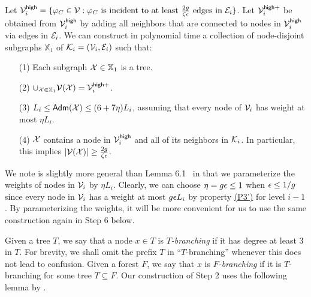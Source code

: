 \begin{lemma}\label{lm:Clustering-Step1T2} Let $\mathcal{V}^{\mathsf{high}}_i = \{\varphi_{C} \in \mathcal{V}: \varphi_{C} \mbox{ is incident to at least $\frac{2g}{\zeta\epsilon}$ edges in } \mathcal{E}_i\}$. Let $\mathcal{V}_i^{\mathsf{high}+}$ be obtained from $\mathcal{V}^{\mathsf{high}}_i$  by adding all neighbors that are connected to nodes in $\mathcal{V}^{\mathsf{high}}_i$ via edges in $\mathcal{E}_i$. We can construct in polynomial time a collection of node-disjoint subgraphs $\mathbb{X}_1$ of $\mathcal{K}_i =(\mathcal{V}_i, \mathcal{E}_i)$ such that:
	\begin{enumerate}[noitemsep]
		\item[(1)] Each subgraph $\mathcal{X} \in \mathbb{X}_1$ is a tree.
		\item[(2)] $\cup_{\mathcal{X} \in \mathbb{X}_1}\mathcal{V}(\mathcal{X}) = \mathcal{V}^{\mathsf{high}+}_i$.
		\item[(3)] $L_i \leq \mathsf{Adm}(\mathcal{X}) \leq (6+7\eta)L_i$, assuming that every node of $\mathcal{V}_i$ has weight at most $\eta L_i$.
		\item[(4)] $\mathcal{X}$ contains a node in $\mathcal{V}^{\mathsf{high}}_i$ and all of its neighbors in $\mathcal{K}_i$. In particular,  this implies $|\mathcal{V}(\mathcal{X})|\geq \frac{2g}{\zeta\epsilon}$.
	\end{enumerate}
\end{lemma}

We note  is slightly more general than Lemma 6.1~\cite{LS21} in that we parameterize the weights of nodes in $\mathcal{V}_i$ by $\eta L_i$. Clearly, we can choose $\eta = g\epsilon \leq 1$ when $\epsilon \leq 1/g$ since every node in $\mathcal{V}_i$ has a weight at most $g\epsilon L_i$ by property \hyperlink{P3'}{(P3')} for level $i-1$. By parameterizing the weights, it will be more convenient for us to use the same construction again in Step 6 below. 



Given a tree $T$, we say that a node $x\in T$ is \emph{$T$-branching} if it has degree at least 3 in $T$.  For brevity, we shall omit the prefix $T$ in ``$T$-branching'' whenever this does not lead to  confusion.  Given a forest $F$, we say that $x$ is \emph{$F$-branching} if it is $T$-branching for some tree $T\subseteq F$. Our construction of Step 2 uses the following lemma by \cite{LS19}.

